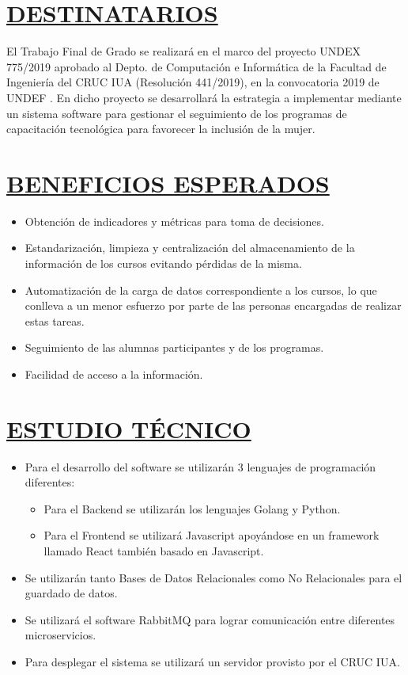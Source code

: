 \section*{\underline{DESTINATARIOS}}
El Trabajo Final de Grado se realizará en el marco del proyecto UNDEX 775/2019 aprobado al Depto. de Computación e Informática de la Facultad de Ingeniería del CRUC IUA (Resolución 441/2019), en la convocatoria 2019 de UNDEF \textbf{\cite{ResolucionUndex}}. En dicho proyecto se desarrollará la estrategia a implementar mediante un sistema software para gestionar el seguimiento de los programas de capacitación tecnológica para favorecer la inclusión de la mujer. \\


\section*{\underline{BENEFICIOS ESPERADOS}}
\begin{itemize}
	\item Obtención de indicadores y métricas para toma de decisiones.
	\item Estandarización, limpieza y centralización del almacenamiento de la información de los cursos evitando pérdidas de la misma.
	\item Automatización de la carga de datos correspondiente a los cursos, lo que conlleva a un menor esfuerzo por parte de las personas encargadas de realizar estas tareas.
	\item Seguimiento de las alumnas participantes y de los programas.
	\item Facilidad de acceso a la información.\\
\end{itemize}


\section*{\underline{ESTUDIO TÉCNICO}}
\begin{itemize}
	\item Para el desarrollo del software se utilizarán 3 lenguajes de programación diferentes:
	\begin{itemize}
		\item Para el Backend se utilizarán los lenguajes Golang y Python.
		\item Para el Frontend se utilizará Javascript apoyándose en un framework llamado React también basado en Javascript.
	\end{itemize}
	\item Se utilizarán tanto Bases de Datos Relacionales como No Relacionales para el guardado de datos.
	\item Se utilizará el software RabbitMQ para lograr comunicación entre diferentes microservicios.
	\item Para desplegar el sistema se utilizará un servidor provisto por el CRUC IUA.\\
\end{itemize}



